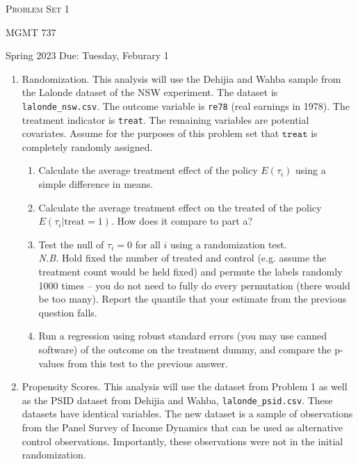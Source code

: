 \documentclass[11pt, a4paper]{article}
\begin{document}
\begin{center}
  {\Large \textsc{Problem Set 1}}

  MGMT 737
\end{center}
\begin{center}
  Spring 2023
  Due: Tuesday, Feburary 1
\end{center}

\begin{enumerate}
\item Randomization. This analysis will use the Dehijia
  and Wahba sample from the Lalonde dataset of the NSW experiment. The dataset is
  \texttt{lalonde\_nsw.csv}. The outcome variable is \texttt{re78}
  (real earnings in 1978). The treatment indicator is
  \texttt{treat}. The remaining variables are potential covariates. Assume for the purposes of this problem set that $\texttt{treat}$ is completely randomly assigned. 
  \begin{enumerate}
  \item Calculate the average treatment effect of the policy
    $E(\tau_{i})$ using a simple difference in means.
  \item Calculate the average treatment effect on the treated of the policy
    $E(\tau_{i}| \mathrm{treat} = 1)$. How does it compare to part a? 
  \item Test the null of $\tau_{i} = 0$ for all $i$ using a
    randomization test. \\
    \emph{N.B.} Hold fixed the number of treated and control
    (e.g. assume the treatment count would be held fixed) and permute
    the labels randomly 1000 times -- you do not need to fully do
    every permutation (there would be too many). Report the quantile
    that your estimate from the previous question falls.
  \item Run a regression using robust standard errors (you may use
    canned software) of the outcome on the treatment dummy, and
    compare the p-values from this test to the previous answer.
  \end{enumerate}
\item Propensity Scores. This analysis will use the dataset
  from Problem 1 as well as the PSID dataset from Dehijia and
  Wahba, \texttt{lalonde\_psid.csv}. These datasets have identical
  variables. The new dataset is a sample of observations from the
  Panel Survey of Income Dynamics that can be used as alternative
  control observations. Importantly, these observations were not in
  the initial randomization.
  \begin{enumerate}

\end{enumerate}
\end{enumerate}
\end{document}

